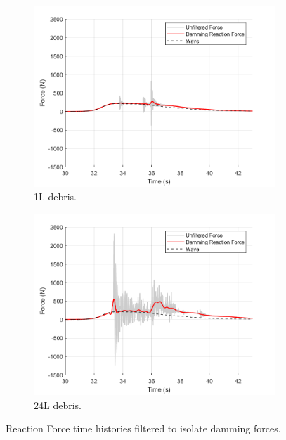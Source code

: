 \documentclass{article}
\begin{document}
\begin{figure}[h!]
    \centering
    \begin{subfigure}[b]{0.9\textwidth}
        \centering
        \includegraphics[width=\textwidth]{Reg_Lift_U_1_L_D__Masters_NHERIDeprisImpact2_goodtests_Reg_Lift_U_1_L_Trial04_Damming.png}
        \caption{1L debris.}
        \label{fig:timehist_1L_damming}
    \end{subfigure}
    \hfill
    \begin{subfigure}[b]{0.9\textwidth}
        \centering
        \includegraphics[width=\textwidth]{Reg_Lift_U_24_L_D__Masters_NHERIDeprisImpact2_goodtests_Reg_Lift_U_24_L_Trial04_Damming.png}
        \caption{24L debris.}
        \label{fig:timehist_24L_damming}
    \end{subfigure}
    \caption{Reaction Force time histories filtered to isolate damming forces.}
    \label{fig:timehist_damming_combined}
\end{figure}
\end{document}

